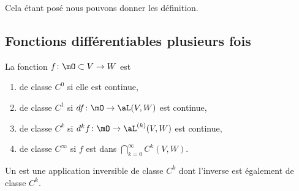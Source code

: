 Cela étant posé nous pouvons donner les définition.

\subsection{Fonctions différentiables plusieurs fois}

\begin{definition}  \label{DefPNjMGqy}
    La fonction \( f\colon \mO\subset V\to W\) est
    \begin{enumerate}
        \item
            de classe \( C^0\) si elle est continue,
        \item
            de classe \( C^1\) si \( df\colon \mO\to \aL(V,W)\) est continue,
        \item
            de classe \( C^k\) si \( d^kf\colon \mO\to \aL^{(k)}(V,W)\) est continue,
        \item
            de classe \(  C^{\infty}\) si \( f\) est dans \( \bigcap_{k=0}^{\infty}C^k(V,W)\).
    \end{enumerate}
\end{definition}

\begin{definition}
    Un  est une application inversible de classe \( C^k\) dont l'inverse est également de classe \( C^k\).
\end{definition}

